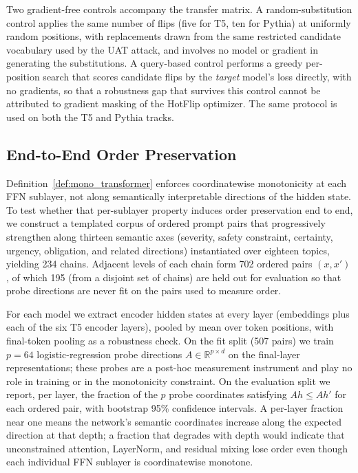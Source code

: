 \documentclass{article}
\theoremstyle{plain}
\theoremstyle{definition}
\theoremstyle{remark}
\begin{document}
Two gradient-free controls accompany the transfer matrix. A random-substitution control applies the same number of flips (five for T5, ten for Pythia) at uniformly random positions, with replacements drawn from the same restricted candidate vocabulary used by the UAT attack, and involves no model or gradient in generating the substitutions. A query-based control performs a greedy per-position search that scores candidate flips by the \emph{target} model's loss directly, with no gradients, so that a robustness gap that survives this control cannot be attributed to gradient masking of the HotFlip optimizer. The same protocol is used on both the T5 and Pythia tracks.

\subsection{End-to-End Order Preservation}
\label{sec:order-preservation}
Definition~\ref{def:mono_transformer} enforces coordinatewise monotonicity at each FFN sublayer, not along semantically interpretable directions of the hidden state. To test whether that per-sublayer property induces order preservation end to end, we construct a templated corpus of ordered prompt pairs that progressively strengthen along thirteen semantic axes (severity, safety constraint, certainty, urgency, obligation, and related directions) instantiated over eighteen topics, yielding 234 chains. Adjacent levels of each chain form 702 ordered pairs $(x,x')$, of which 195 (from a disjoint set of chains) are held out for evaluation so that probe directions are never fit on the pairs used to measure order.

For each model we extract encoder hidden states at every layer (embeddings plus each of the six T5 encoder layers), pooled by mean over token positions, with final-token pooling as a robustness check. On the fit split (507 pairs) we train $p=64$ logistic-regression probe directions $A\in\mathbb{R}^{p\times d}$ on the final-layer representations; these probes are a post-hoc measurement instrument and play no role in training or in the monotonicity constraint. On the evaluation split we report, per layer, the fraction of the $p$ probe coordinates satisfying $Ah \le Ah'$ for each ordered pair, with bootstrap 95\% confidence intervals. A per-layer fraction near one means the network's semantic coordinates increase along the expected direction at that depth; a fraction that degrades with depth would indicate that unconstrained attention, LayerNorm, and residual mixing lose order even though each individual FFN sublayer is coordinatewise monotone.
\end{document}
